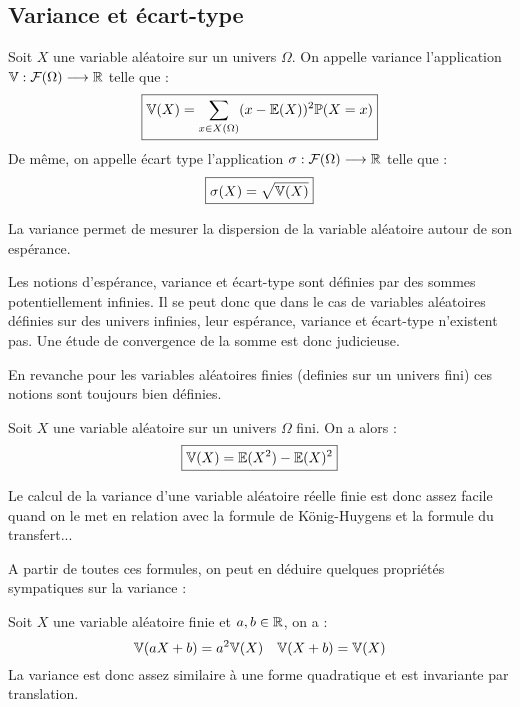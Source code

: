 \subsection{Variance et écart-type}

\begin{definition}
    Soit $X$ une variable aléatoire sur un univers $\Omega$. On appelle variance l'application 
    $\mathbb{V} : \mathcal{F}(\Omega) \longrightarrow \mathbb{R}$ telle que :
        \[ \boxed { \mathbb{V}(X) = \sum_{x \in X(\Omega)} (x - \mathbb{E}(X))^2 \mathbb{P}(X = x) } \]
    De même, on appelle écart type l'application $ \sigma : \mathcal{F}(\Omega) \longrightarrow \mathbb{R}$ telle que : 
        \[ \boxed{ \sigma(X) = \sqrt{\mathbb{V}(X)} } \]  
\end{definition}

La variance permet de mesurer la dispersion de la variable aléatoire autour de son espérance. 

\begin{remark}
    Les notions d'espérance, variance et écart-type sont définies par des sommes potentiellement infinies. 
    Il se peut donc que dans le cas de variables aléatoires définies sur des univers infinies, leur espérance, 
    variance et écart-type n'existent pas. Une étude de convergence de la somme est donc judicieuse. 

    En revanche pour les variables aléatoires finies (definies sur un univers fini) ces notions sont toujours 
    bien définies. 
\end{remark}

\begin{theorem}
    Soit $X$ une variable aléatoire sur un univers $\Omega$ fini. On a alors : 
        \[ \boxed{ \mathbb{V}(X) = \mathbb{E}(X^2) - \mathbb{E}(X)^2 } \]
\end{theorem}

\begin{remark}
    Le calcul de la variance d'une variable aléatoire réelle finie est donc assez facile quand on le met en relation 
    avec la formule de König-Huygens et la formule du transfert...
\end{remark}

A partir de toutes ces formules, on peut en déduire quelques propriétés sympatiques sur la variance :

\begin{prop}[Variance]
    Soit $X$ une variable aléatoire finie et $a,b \in \mathbb{R}$, on a :
        \[ \mathbb{V}(aX+b) = a^2 \mathbb{V}(X) \quad \mathbb{V}(X + b) = \mathbb{V}(X) \]
    La variance est donc assez similaire à une forme quadratique et est invariante par translation. 
\end{prop}

